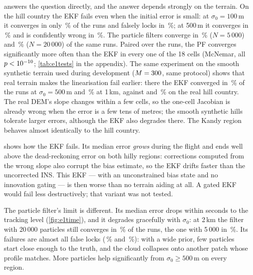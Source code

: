  answers the question directly, and the answer depends strongly on the
terrain. On the hill country the EKF fails even when the initial error is small: at
$\sigma_0 = 100$\,m it converges in only \EOneHillSOneZeroZeroEkfConv\,\% of the runs and
falsely locks in \EOneHillSOneZeroZeroEkfFl\,\%; at 500\,m it converges in
\EOneHillSFiveZeroZeroEkfConv\,\% and is confidently wrong in \EOneHillSFiveZeroZeroEkfFl\,\%. The
particle filters converge in \EOneHillSFiveZeroZeroPfFiveZeroZeroZeroConv\,\% ($N=5\,000$) and
\EOneHillSFiveZeroZeroPfTwoZeroZeroZeroZeroConv\,\% ($N=20\,000$) of the same runs. Paired over the
runs, the PF converges significantly more often than the EKF in every one of the 18 cells
(McNemar, all $p < 10^{-10}$; \cref{tab:e1tests} in the appendix). The same
experiment on the smooth synthetic terrain used during development ($M = 300$, same
protocol) shows that real terrain makes the linearisation fail earlier: there the EKF converged in
\EOneSynthSFiveZeroZeroEkfConv\,\% of the runs at $\sigma_0 = 500$\,m and
\EOneSynthSOneZeroZeroZeroEkfConv\,\% at 1\,km, against \EOneHillSFiveZeroZeroEkfConv{} and
\EOneHillSOneZeroZeroZeroEkfConv\,\% on the real hill country. The real DEM's slope changes within a
few cells, so the one-cell Jacobian is already wrong when the error is a few tens of metres; the
smooth synthetic hills tolerate larger errors, although the EKF also degrades there. The Kandy
region behaves almost identically to the hill country.

 shows how the EKF fails. Its median error \emph{grows} during the flight and
ends well above the dead-reckoning error on both hilly regions: corrections computed from the
wrong slope also corrupt the bias estimate, so the EKF drifts faster than the uncorrected INS.
This EKF --- with an unconstrained bias state and no innovation gating --- is then worse than no
terrain aiding at all. A gated EKF would fail less destructively; that variant was not tested.

The particle filter's limit is different. Its median error drops within seconds to the tracking
level (\cref{fig:e1time}), and
it degrades gracefully with $\sigma_0$: at 2\,km the filter with 20\,000 particles still converges in
\EOneHillSTwoZeroZeroZeroPfTwoZeroZeroZeroZeroConv\,\% of the runs, the one with 5\,000 in
\EOneHillSTwoZeroZeroZeroPfFiveZeroZeroZeroConv\,\%. Its failures are almost all false locks
(\EOneHillSTwoZeroZeroZeroPfFiveZeroZeroZeroFl\,\% and
\EOneHillSTwoZeroZeroZeroPfTwoZeroZeroZeroZeroFl\,\%): with a wide prior, few particles start
close enough to the truth, and the cloud collapses onto another patch whose profile matches.
More particles help significantly from $\sigma_0 \ge 500$\,m on every region.

